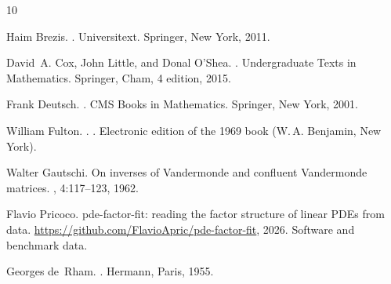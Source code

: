 \documentclass[11pt]{article}
\theoremstyle{plain}
\theoremstyle{definition}
\theoremstyle{remark}
\begin{document}
\begin{thebibliography}{10}

Haim Brezis.
.
\newblock Universitext. Springer, New York, 2011.

David~A. Cox, John Little, and Donal O'Shea.
.
\newblock Undergraduate Texts in Mathematics. Springer, Cham, 4 edition, 2015.

Frank Deutsch.
.
\newblock CMS Books in Mathematics. Springer, New York, 2001.

William Fulton.
.
.
\newblock Electronic edition of the 1969 book (W.\,A. Benjamin, New York).

Walter Gautschi.
\newblock On inverses of {V}andermonde and confluent {V}andermonde matrices.
, 4:117--123, 1962.

Flavio Pricoco.
\newblock pde-factor-fit: reading the factor structure of linear {PDE}s from data.
\newblock \url{https://github.com/FlavioApric/pde-factor-fit}, 2026.
\newblock Software and benchmark data.

Georges de~Rham.
.
\newblock Hermann, Paris, 1955.

\end{thebibliography}
\end{document}
